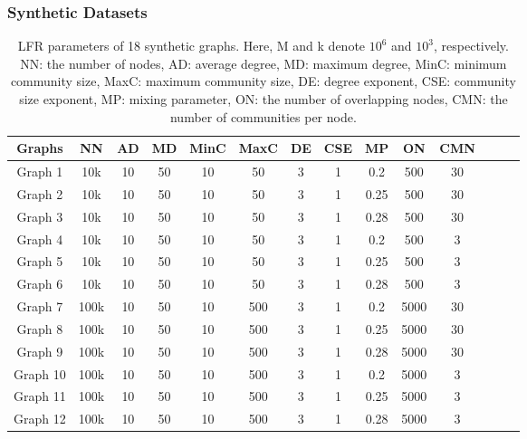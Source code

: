 \documentclass[format=acmsmall, review=false, screen=true]{acmart}
\begin{document}
\subsubsection{Synthetic Datasets}\label{sec:5a1}
\begin{table}[t]
\centering
\caption{LFR parameters of 18 synthetic graphs. Here, M and k denote $10^6$ and $10^3$, respectively. NN: the number of nodes, AD: average degree, MD: maximum degree, MinC: minimum community size, MaxC: maximum community size, DE: degree exponent, CSE: community size exponent, MP: mixing parameter, ON: the number of overlapping nodes, CMN: the number of communities per node.}
\label{table:1}
\begin{tabular}{|c|c|c|c|c|c|c|c|c|c|c|c|c|c|}
\hline
{\textbf{Graphs}} & \textbf{NN} & \textbf{AD} & \textbf{MD} & \textbf{MinC} &\textbf{MaxC} &\textbf{DE} &\textbf{CSE} &\textbf{MP} &\textbf{ON} &\textbf{CMN} \\ \hline
Graph 1          & 10k    & 10    & 50  & 10    & 50    & 3 
& 1    & 0.2    & 500 & 30    \\ 
Graph 2          & 10k    & 10    & 50  & 10    & 50    & 3 
& 1    & 0.25    & 500 & 30    \\ 
Graph 3          & 10k    & 10    & 50  & 10    & 50    & 3 
& 1    & 0.28    & 500 & 30    \\ 
Graph 4          & 10k    & 10    & 50  & 10    & 50    & 3 
& 1    & 0.2    & 500 & 3    \\ 
Graph 5          & 10k    & 10    & 50  & 10    & 50    & 3 
& 1    & 0.25    & 500 & 3    \\ 
Graph 6          & 10k    & 10    & 50  & 10    & 50    & 3 
& 1    & 0.28    & 500 & 3    \\ 
Graph 7          & 100k    & 10    & 50  & 10    & 500    & 3 
& 1    & 0.2    & 5000 & 30    \\ 
Graph 8          & 100k    & 10    & 50  & 10    & 500    & 3 
& 1    & 0.25    & 5000 & 30    \\ 
Graph 9          & 100k    & 10    & 50  & 10    & 500    & 3 
& 1    & 0.28    & 5000 & 30    \\ 
Graph 10          & 100k     & 10    & 50 & 10    & 500    & 3 
& 1    & 0.2    & 5000 & 3    \\ 
Graph 11          & 100k     & 10    & 50  & 10    & 500    & 3 
& 1    & 0.25    & 5000 & 3    \\ 
Graph 12          & 100k    & 10    & 50  & 10    & 500    & 3 
& 1    & 0.28    & 5000 & 3    \\ 

\end{tabular}
\end{table}
\end{document}
